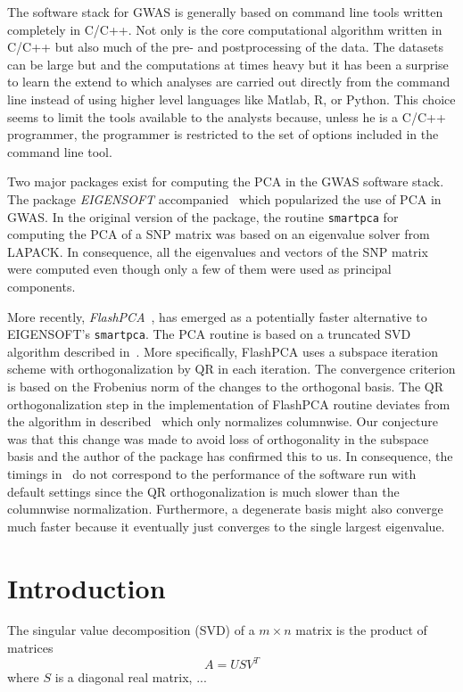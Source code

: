 \documentclass[final,leqno]{siamltex1213}
\begin{document}
The software stack for GWAS is generally based on command line tools written completely in C/C++. Not only is the core computational algorithm written in C/C++ but also much of the pre- and postprocessing of the data. The datasets can be large but and the computations at times heavy but it has been a surprise to learn the extend to which analyses are carried out directly from the command line instead of using higher level languages like Matlab, R, or Python. This choice seems to limit the tools available to the analysts because, unless he is a C/C++ programmer, the programmer is restricted to the set of options included in the command line tool.

Two major packages exist for computing the PCA in the GWAS software stack. The package \emph{EIGENSOFT} accompanied~\cite{patterson2006population} which popularized the use of PCA in GWAS. In the original version of the package, the routine \texttt{smartpca} for computing the PCA of a SNP matrix was based on an eigenvalue solver from LAPACK. In consequence, all the eigenvalues and vectors of the SNP matrix were computed even though only a few of them were used as principal components.

More recently, \emph{FlashPCA}~\cite{abraham2014fast}, has emerged as a potentially faster alternative to EIGENSOFT's \texttt{smartpca}. The PCA routine is based on a truncated SVD algorithm described in~\cite{halko2011finding}. More specifically, FlashPCA uses a subspace iteration scheme with orthogonalization by QR in each iteration. The convergence criterion is based on the Frobenius norm of the changes to the orthogonal basis. The QR orthogonalization step in the implementation of FlashPCA routine deviates from the algorithm in described~\cite{abraham2014fast} which only normalizes columnwise. Our conjecture was that this change was made to avoid loss of orthogonality in the subspace basis and the author of the package has confirmed this to us. In consequence, the timings in~\cite{abraham2014fast} do not correspond to the performance of the software run with default settings since the QR orthogonalization is much slower than the columnwise normalization. Furthermore, a degenerate basis might also converge much faster because it eventually just converges to the single largest eigenvalue.

\section{Introduction}

The singular value decomposition (SVD) of a $m\times n$ matrix is
the product of matrices
\[
A=USV^{T}
\]
where $S$ is a diagonal real matrix, ...
\end{document}
